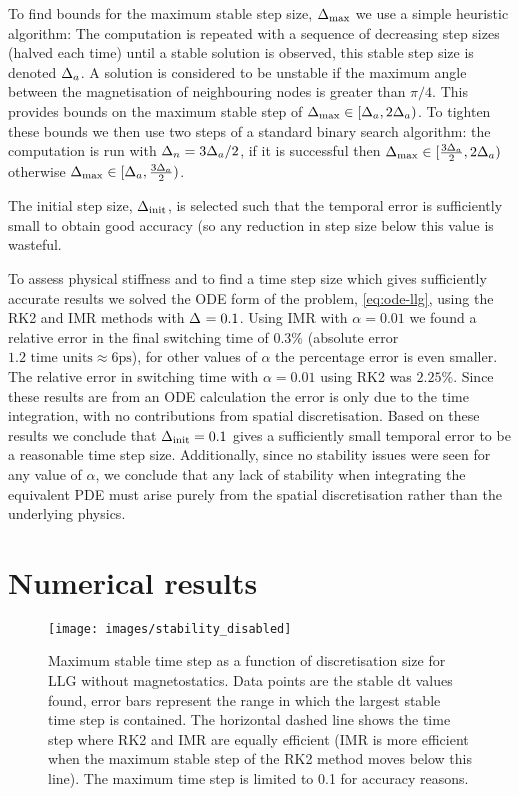 To find bounds for the maximum stable step size, $\Delta_{\mathrm{max}}$ we use a simple heuristic algorithm:
The computation is repeated with a sequence of decreasing step sizes (halved each time) until a stable solution is observed, this stable step size is denoted $\Delta_{a}$.
A solution is considered to be unstable if the maximum angle between the magnetisation of neighbouring nodes is greater than $\pi/4$.
This provides bounds on the maximum stable step of $\Delta_{\mathrm{max}} \in [\Delta_{a}, 2\Delta_{a})$. To tighten these bounds we then use two steps of a standard binary search algorithm: the computation is run with $\Delta_{n}{} = 3\Delta_{a}/2$, if it is successful then $\Delta_{\mathrm{max}} \in [\frac{3\Delta_{a}}{2}, 2\Delta_{a})$ otherwise $\Delta_{\mathrm{max}} \in [\Delta_{a}, \frac{3\Delta_{a}}{2})$.

The initial step size, $\Delta_{\mathrm{init}}$, is selected such that the temporal error is sufficiently small to obtain good accuracy (so any reduction in step size below this value is wasteful.

To assess physical stiffness and to find a time step size which gives sufficiently accurate results we solved the ODE form of the problem, \cref{eq:ode-llg}, using the RK2 and IMR methods with $\Delta_{} = 0.1$.
Using IMR with $\alpha = 0.01$ we found a relative error in the final switching time of $0.3\%$ (absolute error  $1.2 \text{ time units} \approx 6\text{ps}$), for other values of $\alpha$ the percentage error is even smaller.
The relative error in switching time with $\alpha = 0.01$ using RK2 was $2.25\%$.
Since these results are from an ODE calculation the error is only due to the time integration, with no contributions from spatial discretisation.
Based on these results we conclude that $\Delta_{\mathrm{init}} = 0.1$ gives a sufficiently small temporal error to be a reasonable time step size.
Additionally, since no stability issues were seen for any value of $\alpha$, we conclude that any lack of stability when integrating the equivalent PDE must arise purely from the spatial discretisation rather than the underlying physics.


\section{Numerical results}


\begin{figure}
  \centering
  \texttt{[image: images/stability\_disabled]}
  \caption{Maximum stable time step as a function of discretisation size for LLG without magnetostatics. Data points are the stable dt values found, error bars represent the range in which the largest stable time step is contained. The horizontal dashed line shows the time step where RK2 and IMR are equally efficient (IMR is more efficient when the maximum stable step of the RK2 method moves below this line). The maximum time step is limited to 0.1 for accuracy reasons.}
  \label{fig:no-hms-stability}
\end{figure}


